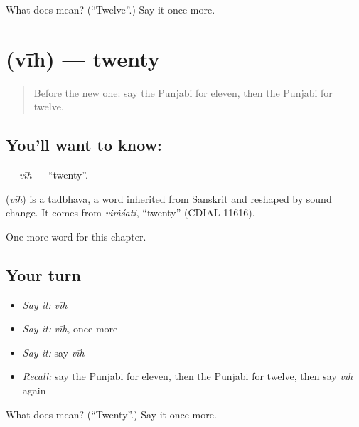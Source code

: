 \begin{tcolorbox}[breakable,colback=teal!4,colframe=teal!35!black,title={Before you move on}]
What does  mean? (\textquotedblleft{}Twelve\textquotedblright{}.) Say it once more.
\end{tcolorbox}
\section[\texorpdfstring{\pa{ਵੀਹ} (vīh)}{ਵੀਹ (vīh)}]{ (vīh) — twenty}

\label{lesson:PA-C96-vih}



\begin{quote}
Before the new one: say the Punjabi for eleven, then the Punjabi for twelve.
\end{quote}

\subsection*{You'll want to know: }
\textbf{} — \emph{vīh} — \textquotedblleft{}twenty\textquotedblright{}.

\begin{cousinweb}
\textbf{} (\emph{vīh}) is a tadbhava, a word inherited from Sanskrit and reshaped by sound change. It comes from \emph{viṁśati}, \textquotedblleft{}twenty\textquotedblright{} (CDIAL 11616).
\end{cousinweb}

\begin{grammarlens}[title={What you've built}]
One more word for this chapter.
\end{grammarlens}

\subsection*{Your turn}
\begin{itemize}
\raggedright
  \item \emph{Say it:} \emph{vīh}
  \item \emph{Say it:} \emph{vīh}, once more
  \item \emph{Say it:} say \emph{vīh}
  \item \emph{Recall:} say the Punjabi for eleven, then the Punjabi for twelve, then say \emph{vīh} again
\end{itemize}

\begin{tcolorbox}[breakable,colback=teal!4,colframe=teal!35!black,title={Before you move on}]
What does  mean? (\textquotedblleft{}Twenty\textquotedblright{}.) Say it once more.
\end{tcolorbox}
